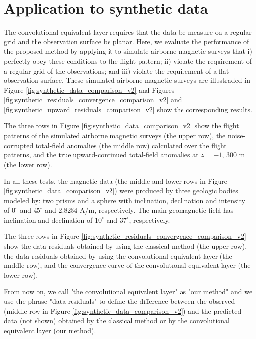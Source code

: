 \section{Application to synthetic data}

The convolutional equivalent layer requires that the data be measure on a regular grid and the observation surface be planar.
Here, we evaluate the performance of the proposed method by applying it to simulate airborne magnetic surveys 
that i) perfectly obey these conditions to the flight pattern; ii) violate the requirement of a regular grid of the observations; and iii) violate the requirement of a flat observation surface.
These simulated airborne magnetic surveys are illustraded in Figure \ref{fig:synthetic_data_comparison_v2} 
and Figures  \ref{fig:synthetic_residuals_convergence_comparison_v2} and  \ref{fig:synthetic_upward_residuals_comparison_v2} show the corresponding results.

The  three rows in Figure \ref{fig:synthetic_data_comparison_v2} show the flight patterns of the simulated airborne magnetic surveys (the upper row), the noise-corrupted total-field anomalies (the middle row) calculated over the flight patterns, and the true upward-continued total-field anomalies at $z = −1, \, 300$ m (the lower row).

In all these tests, the magnetic data (the middle and lower rows in Figure \ref{fig:synthetic_data_comparison_v2})  were produced by three geologic bodies modeled by: two prisms and a sphere with inclination, declination and intensity of $0^{\circ}$ and $45^{\circ}$ and $2.8284$ A/m, respectively. The main geomagnetic field has inclination and declination of $10^{\circ}$ and $37^{\circ}$, respectively. 

The  three rows in Figure \ref{fig:synthetic_residuals_convergence_comparison_v2}  show the data residuals 
obtained by using the classical method (the upper row), the data residuals obtained by using the
convolutional equivalent layer (the middle row), and the convergence curve of the convolutional equivalent layer (the lower row).

From now on, we call "the convolutional equivalent layer" as "our method" and we use the phrase "data residuals" to define the difference between the observed (middle row in Figure \ref{fig:synthetic_data_comparison_v2}) and the predicted data (not shown) obtained by the classical method or by the convolutional equivalent layer (our method). 


